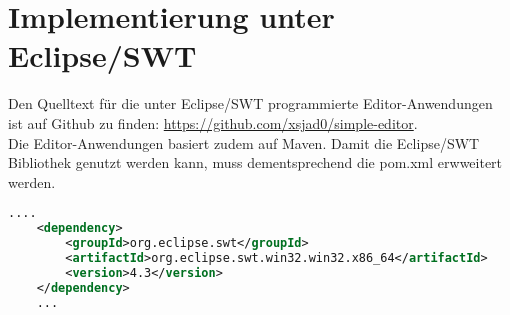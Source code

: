 \section{Implementierung unter Eclipse/SWT}
Den Quelltext für die unter Eclipse/SWT programmierte
Editor-Anwendungen ist auf Github zu finden: \url{https://github.com/xsjad0/simple-editor}.\\
Die Editor-Anwendungen basiert zudem auf Maven. Damit die Eclipse/SWT Bibliothek genutzt
werden kann, muss dementsprechend die pom.xml erwweitert werden.

\begin{lstlisting}[frame=single, language=XML]
    ....
    <dependency>
        <groupId>org.eclipse.swt</groupId>
        <artifactId>org.eclipse.swt.win32.win32.x86_64</artifactId>
        <version>4.3</version>
    </dependency>
    ...
\end{lstlisting}

